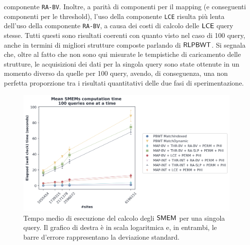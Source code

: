 componente \texttt{RA-BV}. Inoltre, a parità di componenti per il mapping (e
conseguenti componenti per le threshold), l'uso della componente \texttt{LCE}
risulta più lenta dell'uso della componente \texttt{RA-BV}, a causa dei costi di
calcolo delle $\mbox{\rm {\sf LCE}}$ query stesse. Tutti questi sono risultati coerenti
con quanto visto nel caso di 100 query, anche in termini di migliori strutture
composte parlando di $\mbox{\rm {\sf RLPBWT}}$. Si segnala che, oltre al fatto che non
sono qui misurate le tempistiche di caricamento delle strutture, le acquisizioni
dei dati 
per la singola query sono state ottenute in un momento diverso da quelle per 100
query, avendo, di conseguenza, una non perfetta proporzione tra i risultati
quantitativi delle due fasi di sperimentazione.
\begin{figure}
  \centering
  \includegraphics[width=\textwidth]{img/exe_time_single_paper.png}
  \caption{Tempo medio di esecuzione del calcolo degli $\mbox{\rm {\sf SMEM}}$ per una singola
    query. Il grafico di destra è in scala logaritmica e, in entrambi, le
    barre d'errore rappresentano la deviazione standard.}
  \label{fig:smemsinglechr}
\end{figure}


